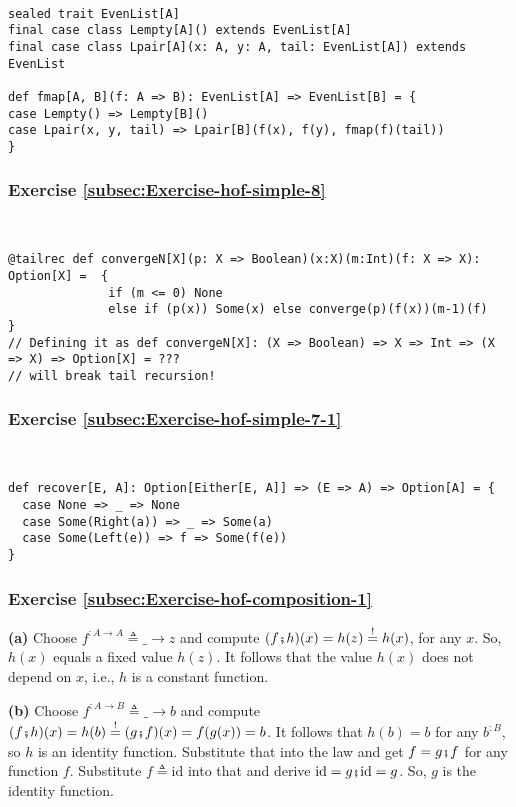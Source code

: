 ~
\begin{lstlisting}
sealed trait EvenList[A]
final case class Lempty[A]() extends EvenList[A]
final case class Lpair[A](x: A, y: A, tail: EvenList[A]) extends EvenList

def fmap[A, B](f: A => B): EvenList[A] => EvenList[B] = {
case Lempty() => Lempty[B]()
case Lpair(x, y, tail) => Lpair[B](f(x), f(y), fmap(f)(tail))
}
\end{lstlisting}


\subsubsection*{Exercise \ref{subsec:Exercise-hof-simple-8}}

~
\begin{lstlisting}
@tailrec def convergeN[X](p: X => Boolean)(x:X)(m:Int)(f: X => X): Option[X] =  {
              if (m <= 0) None
              else if (p(x)) Some(x) else converge(p)(f(x))(m-1)(f)             }
// Defining it as def convergeN[X]: (X => Boolean) => X => Int => (X => X) => Option[X] = ???
// will break tail recursion!
\end{lstlisting}


\subsubsection*{Exercise \ref{subsec:Exercise-hof-simple-7-1}}

~
\begin{lstlisting}
def recover[E, A]: Option[Either[E, A]] => (E => A) => Option[A] = {
  case None => _ => None
  case Some(Right(a)) => _ => Some(a)
  case Some(Left(e)) => f => Some(f(e))
}
\end{lstlisting}


\subsubsection*{Exercise \ref{subsec:Exercise-hof-composition-1}}

\textbf{(a)} Choose $f^{:A\rightarrow A}\triangleq\_\rightarrow z$
and compute $(f\bef h)(x)=h(z)\overset{!}{=}h(x)$, for any $x$.
So, $h(x)$ equals a fixed value $h(z)$. It follows that the value
$h(x)$ does not depend on $x$, i.e., $h$ is a constant function.

\textbf{(b)} Choose $f^{:A\rightarrow B}\triangleq\_\rightarrow b$
and compute $(f\bef h)(x)=h(b)\overset{!}{=}(g\bef f)(x)=f(g(x))=b$.
It follows that $h(b)=b$ for any $b^{:B}$, so $h$ is an identity
function. Substitute that into the law and get $f=g\bef f$ for any
function $f$. Substitute $f\triangleq\text{id}$ into that and derive
$\text{id}=g\bef\text{id}=g$. So, $g$ is the identity function.

